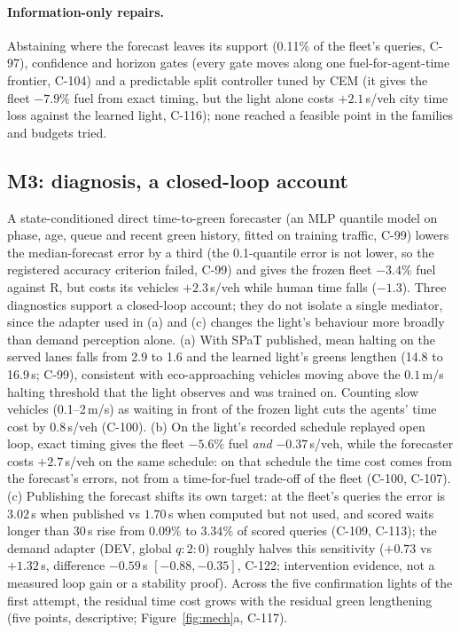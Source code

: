\documentclass[11pt]{article}
\begin{document}
\paragraph{Information-only repairs.} Abstaining where the forecast leaves its support (0.11\% of the fleet's queries, C-97), confidence and
horizon gates (every gate moves along one fuel-for-agent-time frontier, C-104) and a predictable split controller tuned by CEM (it gives the
fleet $-7.9\%$ fuel from exact timing, but the light alone costs $+2.1$\,s/veh city time loss against the learned light, C-116); none
reached a feasible point in the families and budgets tried.

\subsection{M3: diagnosis, a closed-loop account}\label{sec:diag}
A state-conditioned direct time-to-green forecaster (an MLP quantile model on phase, age, queue and recent green history, fitted on training
traffic, C-99) lowers the median-forecast error by a third (the 0.1-quantile error is not lower, so the
registered accuracy criterion failed, C-99) and gives the frozen fleet $-3.4\%$ fuel against R, but costs its vehicles
$+2.3$\,s/veh while human time falls ($-1.3$). Three diagnostics support a closed-loop account; they do not isolate a single mediator,
since the adapter used in (a) and (c) changes the light's behaviour more broadly than demand perception alone.
(a) With SPaT published, mean halting on the served lanes falls from 2.9 to 1.6 and the learned light's greens lengthen (14.8 to 16.9\,s; C-99),
consistent with eco-approaching vehicles moving above the $0.1$\,m/s halting threshold that the light observes and was trained on. Counting slow vehicles
(0.1--2\,m/s) as waiting in front of the frozen light cuts the agents' time cost by $0.8$\,s/veh (C-100).
(b) On the light's recorded schedule replayed open loop, exact timing gives the fleet $-5.6\%$ fuel \emph{and} $-0.37$\,s/veh, while the forecaster
costs $+2.7$\,s/veh on the same schedule: on that schedule the time cost comes from the forecast's errors, not from a time-for-fuel
trade-off of the fleet (C-100, C-107).
(c) Publishing the forecast shifts its own target: at the fleet's queries the error is $3.02$\,s when published vs $1.70$\,s when computed
but not used, and scored waits longer than 30\,s rise from $0.09\%$ to $3.34\%$ of scored queries (C-109, C-113); the demand adapter (DEV, global $q{:}2{:}0$) roughly halves this
sensitivity ($+0.73$ vs $+1.32$\,s, difference $-0.59$\,s $[-0.88,-0.35]$, C-122; intervention evidence, not a measured loop gain or a stability proof). Across the five confirmation lights of the first attempt, the residual time cost grows with the residual green
lengthening (five points, descriptive; Figure~\ref{fig:mech}a, C-117).
\end{document}
